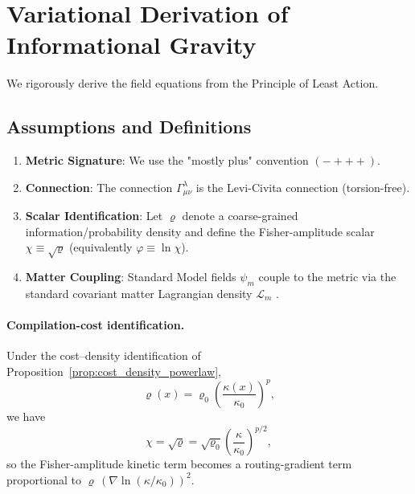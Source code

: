 \section{Variational Derivation of Informational Gravity}
\label{app:action_proof}

We rigorously derive the field equations from the Principle of Least Action.

\subsection{Assumptions and Definitions}
\begin{enumerate}
    \item \textbf{Metric Signature}: We use the "mostly plus" convention $(-+++)$.
    \item \textbf{Connection}: The connection $\Gamma^\lambda_{\mu\nu}$ is the Levi-Civita connection (torsion-free).
    \item \textbf{Scalar Identification}: Let $\varrho$ denote a coarse-grained information/probability density and define the Fisher-amplitude scalar $\chi\equiv \sqrt{\varrho}$ (equivalently $\varphi\equiv\ln\chi$).
    \item \textbf{Matter Coupling}: Standard Model fields $\psi_m$ couple to the metric via the standard covariant matter Lagrangian density $\mathcal{L}_m$ \cite{PeskinSchroeder1995,Carroll2004}.
\end{enumerate}

\paragraph{Compilation-cost identification.}
Under the cost--density identification of Proposition~\ref{prop:cost_density_powerlaw},
\begin{equation}
    \varrho(x)=\varrho_0\left(\frac{\kappa(x)}{\kappa_0}\right)^p,
\end{equation}
we have
\begin{equation}
    \chi=\sqrt{\varrho}=\sqrt{\varrho_0}\left(\frac{\kappa}{\kappa_0}\right)^{p/2},
\end{equation}
so the Fisher-amplitude kinetic term becomes a routing-gradient term proportional to $\varrho\,(\nabla\ln(\kappa/\kappa_0))^2$.

